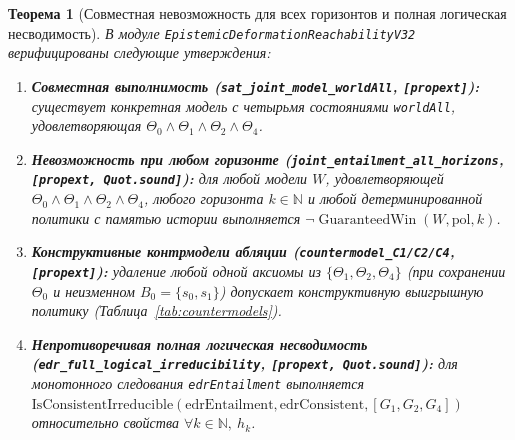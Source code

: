 \documentclass[10pt,a4paper]{article}
\theoremstyle{cleanthm}
\newtheorem{theorem}{Теорема}[section]
\theoremstyle{cleandef}
\DeclareMathOperator{\GuaranteedWin}{GuaranteedWin}
\begin{document}
\begin{theorem}[Совместная невозможность для всех горизонтов и полная логическая несводимость]
\label{thm:joint_and_irr}
В модуле \texttt{EpistemicDeformationReachabilityV32} верифицированы следующие утверждения:
\begin{enumerate}
  \item \textbf{Совместная выполнимость (\texttt{sat\_\allowbreak joint\_\allowbreak model\_\allowbreak worldAll}, \texttt{[propext]}):} существует конкретная модель с четырьмя состояниями \texttt{worldAll}, удовлетворяющая $\Theta_0\land\Theta_1\land\Theta_2\land\Theta_4$.
  \item \textbf{Невозможность при любом горизонте (\texttt{joint\_\allowbreak entailment\_\allowbreak all\_\allowbreak horizons}, \texttt{[propext, Quot.sound]}):} для \emph{любой} модели $W$, удовлетворяющей $\Theta_0\land\Theta_1\land\Theta_2\land\Theta_4$, \emph{любого} горизонта $k\in\mathbb{N}$ и \emph{любой} детерминированной политики с памятью истории выполняется $\neg\GuaranteedWin(W,\mathrm{pol},k)$.
  \item \textbf{Конструктивные контрмодели абляции (\texttt{countermodel\_\allowbreak C1/C2/C4}, \texttt{[propext]}):} удаление любой одной аксиомы из $\{\Theta_1,\Theta_2,\Theta_4\}$ (при сохранении $\Theta_0$ и неизменном $B_0=\{s_0,s_1\}$) допускает конструктивную выигрышную политику (Таблица~\ref{tab:countermodels}).
  \item \textbf{Непротиворечивая полная логическая несводимость (\texttt{edr\_\allowbreak full\_\allowbreak logical\_\allowbreak irreducibility}, \texttt{[propext, Quot.sound]}):} для монотонного следования \texttt{edrEntailment} выполняется $\mathrm{IsConsistentIrreducible}(\allowbreak\mathrm{edrEntailment},\allowbreak\mathrm{edrConsistent},\allowbreak [G_1,G_2,G_4])$ относительно свойства $\forall k\in\mathbb{N},\ h_k$.
\end{enumerate}
\end{theorem}
\end{document}

